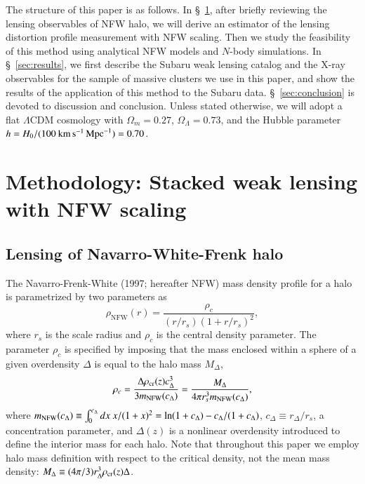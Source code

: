 \documentclass[iop, apj]{emulateapj}
\newcommand{\?}{\stackrel{?}{=}}
\begin{document}
The structure of this paper is as follows. In \S~\ref{sec:method}, after
briefly reviewing the lensing observables of NFW halo, we will derive an
estimator of the lensing distortion profile measurement with NFW
scaling. Then we study the feasibility of this method using analytical
NFW models and $N$-body simulations. In \S~\ref{sec:results}, we first
describe the Subaru weak lensing catalog and the X-ray observables for
the sample of massive clusters we use in this paper, and show the
results of the application of this method to the Subaru data.
\S~\ref{sec:conclusion} is devoted to discussion and conclusion.  Unless
stated otherwise, we will adopt a flat $\Lambda$CDM cosmology with
$\Omega_m=0.27$, $\Omega_\Lambda=0.73$, and the Hubble parameter
$h=H_0/(100\>{\rm km}\,{\rm s}^{-1}\,{\rm Mpc}^{-1})=0.70$.



\section{Methodology: Stacked weak lensing with NFW scaling}
\label{sec:method}

\subsection{Lensing of Navarro-White-Frenk halo}

The Navarro-Frenk-White (1997; hereafter NFW) mass density profile for a
halo is parametrized by two parameters as
%
\begin{equation}
\rho_\mathrm{NFW}(r)= \frac{\rho_{c}}{(r/r_{s})(1+r/r_{s})^2},
\label{eq:rho_nfw}
\end{equation}
%
where $r_s$ is the scale radius and $\rho_c$ is the central density
parameter. The parameter $\rho_c$ is specified by imposing that the mass
enclosed within a sphere of a given overdensity $\Delta$ is equal to the
halo mass $M_\Delta$,
%
\begin{equation}
 \rho_c=\frac{\Delta \rho_{\rm cr}(z)c_\Delta^3}{3m_{\rm NFW}(c_\Delta)}
  =\frac{M_\Delta}{4\pi r_s^3m_{\rm NFW}(c_\Delta)},
  \label{eq:rhoc}
\end{equation}
%
where $m_{\rm NFW}(c_\Delta)\equiv \int^{c_\Delta}_0dx~ x/(1+x)^2
=\ln(1+c_\Delta)- c_\Delta/(1+c_\Delta)$, $c_\Delta \equiv
r_\Delta/r_s$, a concentration parameter, and $\Delta(z)$ is a nonlinear
overdensity introduced to define the interior mass for each halo.  Note
that throughout this paper we employ halo mass definition with respect
to the critical density, not the mean mass density: $M_\Delta\equiv
(4\pi/3)r_\Delta^3 \rho_{\rm cr}(z)\Delta$.
\end{document}
